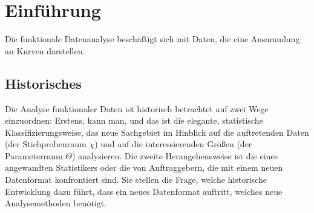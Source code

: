 \documentclass[a4paper,ngerman,oneside,titlepage,11pt]{scrreprt}
\theoremstyle{remark}
\begin{document}
\begin{abstract}


\begin{center}
{\it \bf Abstract} 
\end{center}
Dieser Bericht behandelt die Analyse der \emph{NISAT database of transfers of small arms, light weapons, and their ammunition, parts and accessories}. Die Netzwerkdaten stellen das internationale Kleinwaffenhandelsnetzwerk im Zeitraum 1992 bis 2011 dar.

Nachdem die Datengrundlage besprochen wird, erfolgt eine deskriptive Analyse des Handelsnetzwerkes anhand Zeitreihen von Netzwerkstatistiken. Im zweiten Teil wird der Querschnitt des Netzwerkes Jahr für Jahr anhand von ERGMs modelliert, um charakteristische Strukturen des Netzwerkes aufzudecken. Der Fokus liegt hierbei auf der Selektion interner Netzwerkstatistiken sowie externer Knotencharakteristika. Da dynamische Netzwerkdaten vorliegen, erfolgt im dritten Teil eine Analyse der Netzwerke anhand sogenannter \emph{Separable Temporal Exponential Graph Models} (STERGMs, Krivitsky and Handcock, 2010). Diese Modellklasse separiert zwischen Effekten zur Tie-Formation und Effekten zur Tie-Auflösung. Die Ergebnisse werden zusammengefasst.
% 


\end{abstract}



\tableofcontents




\chapter{Einführung}

Die funktionale Datenanalyse beschäftigt sich mit Daten, die eine Ansammlung an Kurven darstellen.

\section{Historisches}

Die Analyse funktionaler Daten ist historisch betrachtet auf zwei Wege einzuordnen: Erstens, kann man, und das ist die elegante, statistische Klassifizierungsweise, das neue Sachgebiet im Hinblick auf die auftretenden Daten (der Stichprobenraum $\chi$) und auf die interessierenden Größen (der Parameterraum $\Theta$) analysieren. Die zweite Herangehensweise ist die eines angewandten Statistikers oder die von Auftraggebern, die mit einem neuen Datenformat konfrontiert sind. Sie stellen die Frage, welche historische Entwicklung dazu führt, dass ein neues Datenformat auftritt, welches neue Analysemethoden benötigt.
\end{document}
